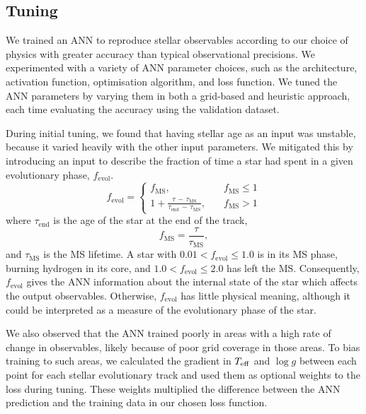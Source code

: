 \subsection{Tuning}\label{sec:opt}



We trained an ANN to reproduce stellar observables according to our choice of physics with greater accuracy than typical observational precisions. We experimented with a variety of ANN parameter choices, such as the architecture, activation function, optimisation algorithm, and loss function. We tuned the ANN parameters by varying them in both a grid-based and heuristic approach, each time evaluating the accuracy using the validation dataset.

During initial tuning, we found that having stellar age as an input was unstable, because it varied heavily with the other input parameters. We mitigated this by introducing an input to describe the fraction of time a star had spent in a given evolutionary phase, $f_\mathrm{evol}$. 
%
\begin{equation}
    f_\mathrm{evol} = \begin{cases}
        f_\mathrm{MS},\quad &f_\mathrm{MS} \leq 1\\
        1 + \frac{\tau\,-\,\tau_\mathrm{MS}}{\tau_\mathrm{end}\,-\,\tau_\mathrm{MS}},\quad &f_\mathrm{MS} > 1
    \end{cases}\label{eq:fevol}
\end{equation}
%
where $\tau_\mathrm{end}$ is the age of the star at the end of the track,
%
\begin{equation}
    f_\mathrm{MS} = \frac{\tau}{\tau_\mathrm{MS}},
\end{equation}
%
and $\tau_\mathrm{MS}$ is the MS lifetime. A star with $0.01 < f_\mathrm{evol} \leq 1.0$ is in its MS phase, burning hydrogen in its core, and $1.0 < f_\mathrm{evol} \leq 2.0$ has left the MS. Consequently, $f_\mathrm{evol}$ gives the ANN information about the internal state of the star which affects the output observables. Otherwise, $f_\mathrm{evol}$ has little physical meaning, although it could be interpreted as a measure of the evolutionary phase of the star.

We also observed that the ANN trained poorly in areas with a high rate of change in observables, likely because of poor grid coverage in those areas. To bias training to such areas, we calculated the gradient in ${T_\mathrm{eff}}$ and $\log g$ between each point for each stellar evolutionary track and used them as optional weights to the loss during tuning. These weights multiplied the difference between the ANN prediction and the training data in our chosen loss function.

